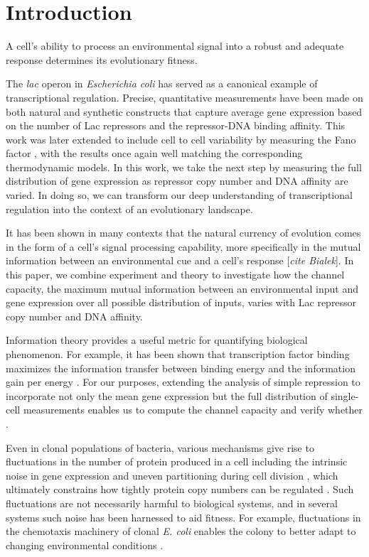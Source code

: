 \section{Introduction}

A cell's ability to process an environmental signal into a robust and adequate
response determines its evolutionary fitness.

The \textit{lac} operon in \textit{Escherichia coli} has served as a canonical
example of transcriptional regulation. Precise, quantitative measurements have
been made on both natural and synthetic constructs \cite{Garcia2011} that
capture average gene expression based on the number of Lac repressors and the
repressor-DNA binding affinity. This work was later extended to include cell to
cell variability by measuring the Fano factor \cite{Jones2014}, with the results
once again well matching the corresponding thermodynamic models. In this work,
we take the next step by measuring the full distribution of gene expression as
repressor copy number and DNA affinity are varied. In doing so, we can transform
our deep understanding of transcriptional regulation into the context of an
evolutionary landscape.

It has been shown in many contexts that the natural currency of evolution comes
in the form of a cell's signal processing capability, more specifically in the
mutual information between an environmental cue and a cell's response
[\textit{cite Bialek}].  In
this paper, we combine experiment and theory to investigate how the channel
capacity, the maximum mutual information between an environmental input and gene
expression over all possible distribution of inputs, varies with Lac repressor
copy number and DNA affinity. 

Information theory provides a useful metric for quantifying biological
phenomenon. For example, it has been shown that transcription factor binding
maximizes the information transfer between binding energy and the information
gain per energy \cite{Savir2016} . For our purposes, extending the analysis of simple repression to
incorporate not only the mean gene expression but the full distribution of
single-cell measurements enables us to compute the channel capacity and verify
whether .

Even in clonal populations of bacteria, various mechanisms give rise to
fluctuations in the number of protein produced in a cell including the intrinsic
noise in gene expression \cite{Elowitz2002} and uneven partitioning during cell
division \cite{Huh2011}, which ultimately constrains how tightly protein copy
numbers can be regulated \cite{Lestas2010}. Such fluctuations are not
necessarily harmful to biological systems, and in several systems such noise has
been harnessed to aid fitness. For example, fluctuations in the chemotaxis
machinery of clonal \textit{E. coli} enables the colony to better adapt to
changing environmental conditions \cite{Frankel2014}.

